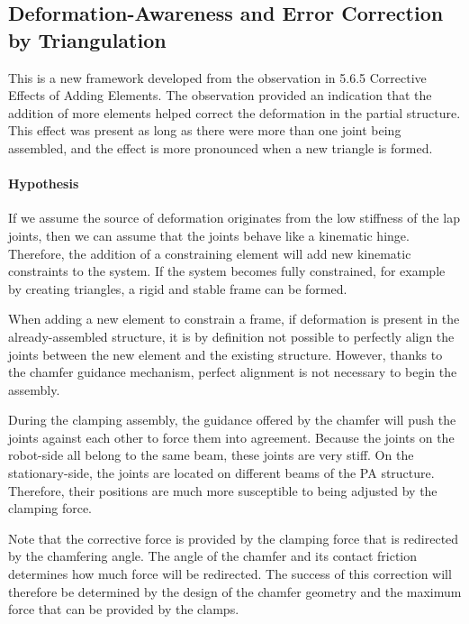 \subsection{Deformation-Awareness and Error Correction by Triangulation}
\label{subsection:exploration_4_deformation_awareness_and_error_correction_by_triangulation}

This is a new framework developed from the observation in 5.6.5 Corrective Effects of Adding Elements. The observation provided an indication that the addition of more elements helped correct the deformation in the partial structure. This effect was present as long as there were more than one joint being assembled, and the effect is more pronounced when a new triangle is formed. 

\paragraph{Hypothesis}

If we assume the source of deformation originates from the low stiffness of the lap joints, then we can assume that the joints behave like a kinematic hinge. Therefore, the addition of a constraining element will add new kinematic constraints to the system. If the system becomes fully constrained, for example by creating triangles, a rigid and stable frame can be formed.

When adding a new element to constrain a frame, if deformation is present in the already-assembled structure, it is by definition not possible to perfectly align the joints between the new element and the existing structure. However, thanks to the chamfer guidance mechanism, perfect alignment is not necessary to begin the assembly.

During the clamping assembly, the guidance offered by the chamfer will push the joints against each other to force them into agreement. Because the joints on the robot-side all belong to the same beam, these joints are very stiff. On the stationary-side, the joints are located on different beams of the PA structure. Therefore, their positions are much more susceptible to being adjusted by the clamping force. 

Note that the corrective force is provided by the clamping force that is redirected by the chamfering angle. The angle of the chamfer and its contact friction determines how much force will be redirected. The success of this correction will therefore be determined by the design of the chamfer geometry and the maximum force that can be provided by the clamps. 

